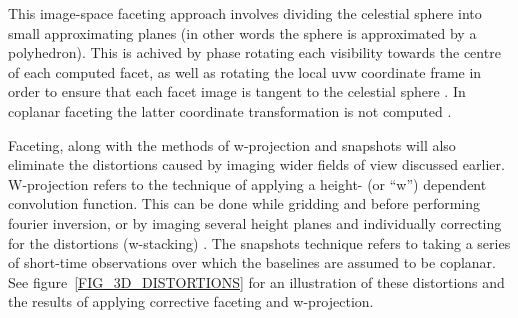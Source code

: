 \documentclass[a4paper, two column]{article}
\begin{document}
This image-space faceting approach involves dividing the celestial sphere into small approximating planes (in other words the sphere is approximated by a polyhedron). This is achived by phase rotating each visibility
towards the centre of each computed facet, as well as rotating the local uvw coordinate frame in order to ensure that each facet image is tangent to the celestial sphere \cite{cornwell1992radio}. In coplanar faceting
the latter coordinate transformation is not computed \cite{AIPS113}.

Faceting, along with the methods of w-projection and snapshots will also eliminate the distortions caused by imaging wider fields of view discussed earlier. W-projection refers to the technique of applying a height- (or ``w'')
dependent convolution function. This can be done while gridding and before performing fourier inversion, or by imaging several height planes and individually correcting for the distortions (w-stacking) \cite{cornwell2005w}. The 
snapshots technique refers to taking a series of short-time observations over which the baselines are assumed to be coplanar. See figure~\ref{FIG_3D_DISTORTIONS} for an illustration of these distortions and the 
results of applying corrective faceting and w-projection.
\end{document}

